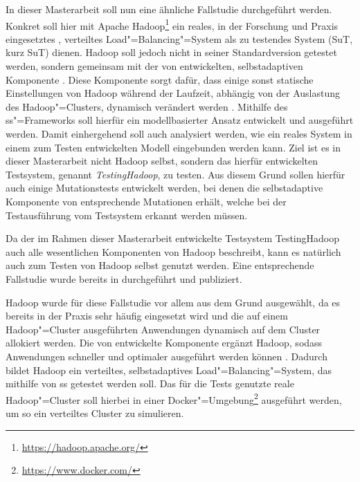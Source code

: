 In dieser Masterarbeit soll nun eine ähnliche Fallstudie durchgeführt werden.
Konkret soll hier mit Apache Hadoop\footnote{\url{https://hadoop.apache.org/}} ein reales, in der Forschung und Praxis eingesetztes \cite{PoweredByHadoop}, verteiltes Load"=Balancing"=System als zu testendes System (\acrlong{SuT}, kurz \acrshort{SuT}) dienen.
Hadoop soll jedoch nicht in seiner Standardversion getestet werden, sondern gemeinsam mit der von \citeauthor{Zhang2016} entwickelten, selbstadaptiven Komponente \cite{Zhang2016}.
Diese Komponente sorgt dafür, dass einige sonst statische Einstellungen von Hadoop während der Laufzeit, abhängig von der Auslastung des Hadoop"=Clusters, dynamisch verändert werden \cite{Zhang2016}.
Mithilfe des \gls{ss}"=Frameworks soll hierfür ein modellbasierter Ansatz entwickelt und ausgeführt werden.
Damit einhergehend soll auch analysiert werden, wie ein reales System in einem zum Testen entwickelten Modell eingebunden werden kann.
Ziel ist es in dieser Masterarbeit nicht Hadoop selbst, sondern das hierfür entwickelten Testsystem, genannt \emph{TestingHadoop}, zu testen.
Aus diesem Grund sollen hierfür auch einige Mutationstests entwickelt werden, bei denen die selbstadaptive Komponente von \citeauthor{Zhang2016} entsprechende Mutationen erhält, welche bei der Testausführung vom Testsystem erkannt werden müssen.

Da der im Rahmen dieser Masterarbeit entwickelte Testsystem TestingHadoop auch alle wesentlichen Komponenten von Hadoop beschreibt, kann es natürlich auch zum Testen von Hadoop selbst genutzt werden.
Eine entsprechende Fallstudie wurde bereits in \cite{Eberhardinger2018} durchgeführt und publiziert.

Hadoop wurde für diese Fallstudie vor allem aus dem Grund ausgewählt, da es bereits in der Praxis sehr häufig eingesetzt wird \cite{PoweredByHadoop} und die auf einem Hadoop"=Cluster ausgeführten Anwendungen dynamisch auf dem Cluster allokiert werden.
Die von \citeauthor{Zhang2016} entwickelte Komponente ergänzt Hadoop, sodass Anwendungen schneller und optimaler ausgeführt werden können \cite{Zhang2016}.
Dadurch bildet Hadoop ein verteiltes, selbstadaptives Load"=Balancing"=System, das mithilfe von \gls{ss} getestet werden soll.
Das für die Tests genutzte reale Hadoop"=Cluster soll hierbei in einer Docker"=Umgebung\footnote{\url{https://www.docker.com/}} ausgeführt werden, um so ein verteiltes Cluster zu simulieren.

